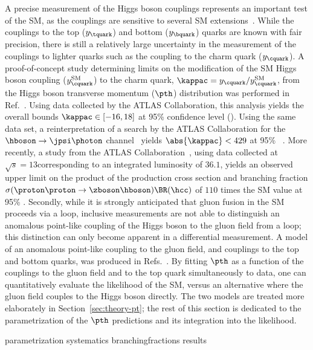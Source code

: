 A precise measurement of the Higgs boson couplings represents an important test of the SM, as the couplings are sensitive to several SM extensions~\cite{Dimopoulos:1981zb,Witten:1981nf}.
% 
While the couplings to the top ($y_\tquark$) and bottom ($y_\bquark$) quarks are known with fair precision, there is still a relatively large uncertainty in the measurement of the couplings to lighter quarks such as the coupling to the charm quark ($y_\cquark$).
% 
A proof-of-concept study determining limits on the modification of the SM Higgs boson coupling ($y_\cquark^\text{SM}$) to the charm quark, $\kappac = y_\cquark / y_\cquark^\text{SM}$, from the Higgs boson transverse momentum ($\pth$) distribution was performed in Ref.~\cite{Bishara:2016jga}.
% 
Using data collected by the ATLAS Collaboration, this analysis yields the overall bounds $\kappac \in [ -16, 18 ]$ at 95\% confidence level (\CL).
% 
Using the same data set, a reinterpretation of a search by the ATLAS Collaboration for the $\hboson\to\jpsi\photon$ channel~\cite{Aad:2015sda} yields $\abs{\kappac}<429$ at 95\% \CL~\cite{Koenig:2015pha}.
% 
More recently, a study from the ATLAS Collaboration~\cite{Aaboud:2018fhh}, using data collected at $\sqrt{s}=13$\TeV corresponding to an integrated luminosity of $36.1$\fbinv, yields an observed upper limit on the product of the production cross section and branching fraction $\sigma(\proton\proton\to\zboson\hboson) \BR(\hcc)$ of $110$ times the SM value at 95\% \CL.
% 
Secondly, while it is strongly anticipated that gluon fusion in the SM proceeds via a loop, inclusive measurements are not able to distinguish an anomalous point-like coupling of the Higgs boson to the gluon field from a loop; this distinction can only become apparent in a differential measurement.
% 
A model of an anomalous point-like coupling to the gluon field, and couplings to the top and bottom quarks, was produced in Refs.~\cite{Grazzini:2017szg,Grazzini:2016paz}.
% 
By fitting $\pth$ as a function of the couplings to the gluon field and to the top quark simultaneously to data, one can quantitatively evaluate the likelihood of the SM, versus an alternative where the gluon field couples to the Higgs boson directly.
% 
The two models are treated more elaborately in Section~\ref{sec:theory-pt}; the rest of this section is dedicated to the parametrization of the $\pth$ predictions and its integration into the likelihood.


{parametrization}
{systematics}
{branchingfractions}
{results}

